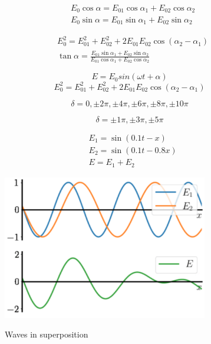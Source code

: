\begin{equation}
\begin{aligned}
&E_{0} \cos \alpha=E_{01} \cos \alpha_{1}+E_{02} \cos \alpha_{2} \\
&E_{0} \sin \alpha=E_{01} \sin \alpha_{1}+E_{02} \sin \alpha_{2}
\end{aligned}
\end{equation}

\begin{equation}
\begin{aligned}
&E_{0}^{2}=E_{01}^{2}+E_{02}^{2}+2 E_{01} E_{02} \cos \left(\alpha_{2}-\alpha_{1}\right) \\
&\tan \alpha=\frac{E_{01} \sin \alpha_{1}+E_{02} \sin \alpha_{2}}{E_{01} \cos \alpha_{1}+E_{02} \cos \alpha_{2}}
\end{aligned}
\end{equation}

\begin{equation}
E = E_0 sin(\omega t + \alpha)
\end{equation}
\begin{equation}
E_{0}^{2}=E_{01}^{2}+E_{02}^{2}+2 E_{01} E_{02} \cos \left(\alpha_{2}-\alpha_{1}\right)
\end{equation}

\begin{equation}
    \delta = 0, \pm2\pi, \pm4\pi, \pm6\pi, \pm8\pi, \pm10\pi
\end{equation}

\begin{equation}
    \delta = \pm1\pi, \pm3\pi, \pm5\pi
\end{equation}

\begin{equation}
\begin{aligned}
&E_{1}=\sin (0.1 t-x) \\
&E_{2}=\sin (0.1 t-0.8 x) \\
&E=E_{1}+E_{2}
\end{aligned}
\end{equation}

\begin{figure}[H]
   \centering
    \includegraphics[width=0.8\textwidth]{lesson6/wave_superposition.pdf}
    \label{fig: 1}
    \begin{center}
        \caption{Waves in superposition}
    \end{center}
\end{figure}

